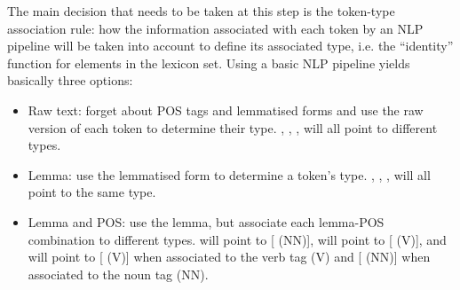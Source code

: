 The main decision that needs to be taken at this step is the token-type association rule: how the information associated with each token by an NLP pipeline will be taken into account to define its associated type, i.e. the ``identity'' function for elements in the lexicon set.
Using a basic NLP pipeline yields basically three options:
\begin{itemize}
    \item Raw text: forget about POS tags and lemmatised forms and use the raw version of each token to determine their type. , , ,  will all point to different types.
    \item Lemma: use the lemmatised form to determine a token's type. , , ,  will all point to the same type.
    \item Lemma and POS: use the lemma, but associate each lemma-POS combination to different types.  will point to [ (NN)],  will point to [ (V)],  and  will point to [ (V)] when associated to the verb tag (V) and [ (NN)] when associated to the noun tag (NN).
\end{itemize}

